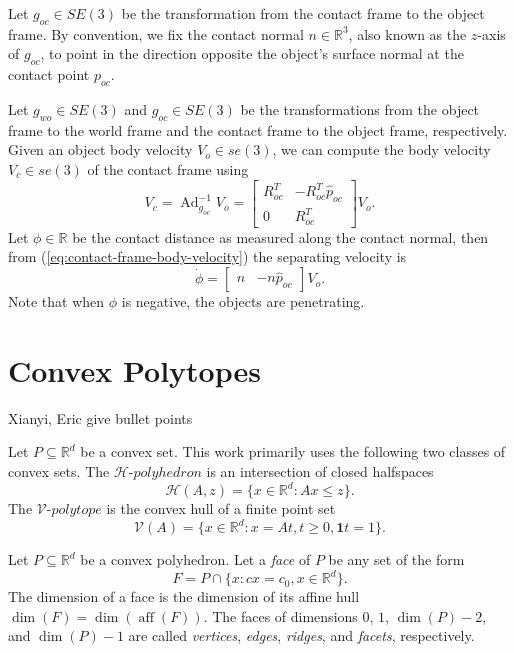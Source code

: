 \documentclass[conference]{IEEEtran}
\DeclareMathOperator{\adjoint}{Ad}
\DeclareMathOperator{\aff}{aff}
\newcommand{\TODO}[1]{{\color{red} {{#1}}}}
\begin{document}
Let $g_{oc} \in SE(3)$ be the transformation from the contact frame to the
object frame. By convention, we fix the contact normal $n \in \mathbb{R}^3$,
also known as the $z$-axis of $g_{oc}$, to point in the direction opposite the
object's surface normal at the contact point $p_{oc}$. 

Let $g_{wo} \in SE(3)$ and $g_{oc} \in SE(3)$ be the transformations from the
object frame to the world frame and the contact frame to the object frame,
respectively. Given an object body velocity $V_o \in se(3)$, we can compute the
body velocity $V_c \in se(3)$ of the contact frame using 
\begin{equation}
    V_c = \adjoint_{g_{oc}}^{-1}V_o = 
    \begin{bmatrix}
        R_{oc}^T & -R_{oc}^T\hat{p}_{oc}\\
        0 & R_{oc}^T
    \end{bmatrix}V_o. \label{eq:contact-frame-body-velocity}
\end{equation}
Let $\phi \in \mathbb{R}$ be the contact distance as measured along the
contact normal, then from (\ref{eq:contact-frame-body-velocity}) the separating
velocity is 
\begin{equation}
\dot{\phi} = \begin{bmatrix} n & -n\hat{p}_{oc} \end{bmatrix}V_o.
\end{equation}
Note that when $\phi$ is negative, the objects are penetrating.

\section{Convex Polytopes}

\TODO{Xianyi, Eric give bullet points}

Let $P \subseteq \mathbb{R}^d$ be a convex set. This work primarily uses the
following two classes of convex sets. The $\mathcal{H}\text{-}polyhedron$ is an
intersection of closed halfspaces
\begin{equation}
    \mathcal{H}(A,z) = \{x \in \mathbb{R}^d : Ax \leq z\}.
\end{equation}
The $\mathcal{V}\text{-}polytope$ is the convex hull of a finite point set
\begin{equation}
    \mathcal{V}(A) = \{x \in \mathbb{R}^d : x = At, t \geq 0, \mathbf{1}t = 1\}.
\end{equation}

Let $P \subseteq \mathbb{R}^d$ be a convex polyhedron. Let a \textit{face} of
$P$ be any set of the form 
\begin{equation}
    F = P \cap \{x : cx = c_0, x \in \mathbb{R}^d\}.
\end{equation}
The dimension of a face is the dimension of its affine hull $\dim(F) =
\dim(\aff(F))$. The faces of dimensions $0$, $1$, $\dim(P)-2$, and $\dim(P)-1$
are called \textit{vertices}, \textit{edges}, \textit{ridges}, and
\textit{facets}, respectively.
\end{document}
